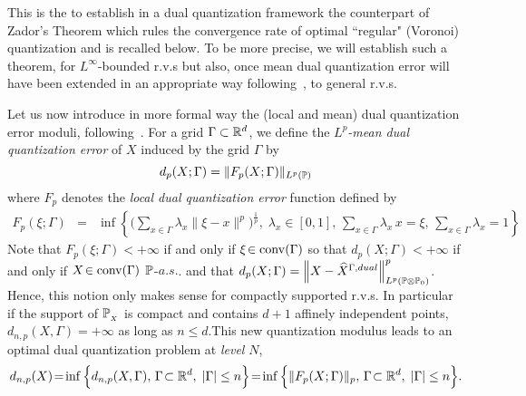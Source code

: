 This is the  to establish  in a dual
quantization framework the counterpart of   Zador's Theorem  which
rules the convergence rate of  optimal ``regular" (Voronoi) quantization and is
recalled below. 
To be more precise, we will  establish such a  theorem, for $L^{\infty}$-bounded r.v.s but also, 
once mean dual quantization error will have been extended in an appropriate way
following~\cite{dualStat}, to general r.v.s.


\smallskip
Let us now introduce in more formal way   the (local and mean) dual quantization error moduli,  following~\cite{dualStat}.  For a grid $\Gamma\subset\mathbb{R}^d$, we define  the {\em $L^p$-mean dual quantization  error} of  $X$ induced by the grid $\Gamma $ by
\begin{equation}\label{def:dpGamma}
d_{p}(X; \Gamma)= \|F_p(X;\Gamma)\|_{L^p(\Prob)}
\end{equation}
where $F_p$ denotes the {\em  local dual quantization error} function  defined by
\begin{eqnarray}
\label{eq:Fp} F_p(\xi;\Gamma)&=&\inf\left \{  \Big(\sum_{x\in \Gamma} \lambda_x \|\xi-x\|^p
\Big)^{\frac 1p},\; \lambda_x\!\in [0,1],\, \sum_{x\in \Gamma}
\lambda_x\, x =\xi,\,
\sum_{x\in \Gamma} \lambda_x=1\right \} 
\end{eqnarray}
Note that $F_p(\xi;\Gamma)<+\infty$ if and only if $\xi\!\in \operatorname{conv}(\Gamma)$ so that  $d_{p}(X; \Gamma)<+\infty $ if and only if $ X\!\in \operatorname{conv}(\Gamma)$ $\mathbb{P}$-$a.s.$. and that $d_{p}(X; \Gamma)= \Big\|X-\widehat X^{\Gamma,dual}\Big\|^p_{L^p(\mathbb{P}\otimes\mathbb{P}_0)}$. Hence, this notion only makes sense for compactly supported r.v.s. In particular if the support of $\mathbb{P}_{_X}$ is compact and contains $d+1$ affinely independent points, $d_{n,p}(X,\Gamma)=+\infty$ as long as $n\le d$.This new quantization modulus leads to an optimal dual quantization problem at {\em level} $N$, 
\begin{equation}\label{def:dnpsharp}
d_{n,p}(X)\!=\!\inf\Big\{d_{n,p}(X, \Gamma),\, \Gamma\!\subset \R^d, \; |\Gamma|\le
n\Big\}
\!=\!\inf\Big\{\|F_p(X;\Gamma)\|_p,\, \Gamma\!\subset \R^d, \; |\Gamma|\le
n\Big\}.
\end{equation}

